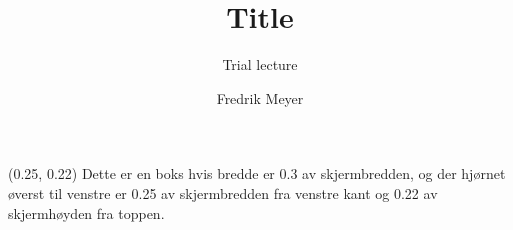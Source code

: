 \documentclass[UKenglish]{beamer}
\title{Title}
\subtitle{Trial lecture}
\author{Fredrik Meyer}
\begin{document}
\begin{frame}

    \begin{textblock}{0.3}(0.25, 0.22)
        Dette er en boks hvis bredde er \alert{0.3} av skjermbredden, og der hjørnet øverst til venstre er \alert{0.25} av skjermbredden fra venstre kant og \alert{0.22} av skjermhøyden fra toppen.
    \end{textblock}

\end{frame}
\end{document}

